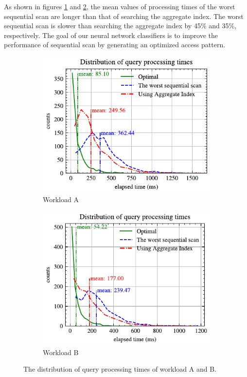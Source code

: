 As shown in figures \ref{fig:agg_vs_partitioned_A} and \ref{fig:agg_vs_partitioned_B}, the mean values of processing times of the worst sequential scan are longer than that of searching the aggregate index. The worst sequential scan is slower than searching the aggregate index by 45\% and 35\%, respectively. The goal of our neural network classifiers is to improve the performance of sequential scan by generating an optimized access pattern.
\begin{figure}[!th]
	\centering
	\begin{subfigure}{0.45\textwidth}
		\centering
		\includegraphics[]{my/graphics/agg_vs_partitioned_A.pdf}
		\caption{Workload A}
		\label{fig:agg_vs_partitioned_A}
	\end{subfigure}
	\hfill
	\begin{subfigure}{0.45\textwidth}
		\centering
		\includegraphics[]{my/graphics/agg_vs_partitioned_B.pdf}
		\caption{Workload B}
		\label{fig:agg_vs_partitioned_B}
	\end{subfigure}
	\caption{The distribution of query processing times of workload A and B.}
	\label{fig:agg_vs_partitioned_all}
\end{figure}

